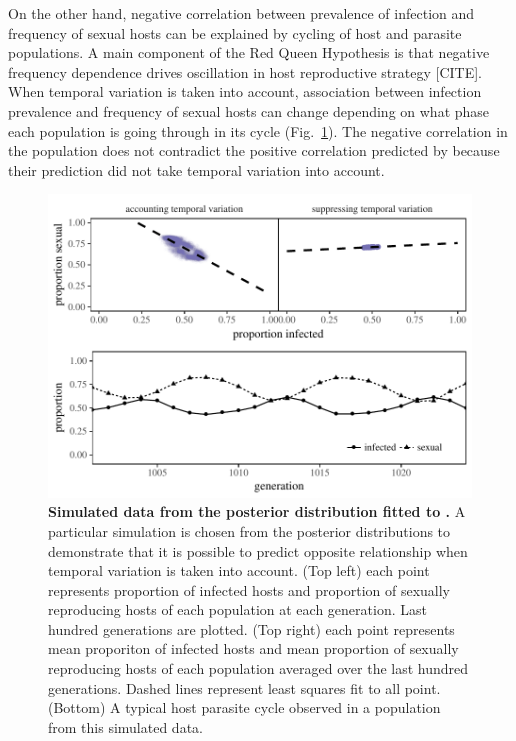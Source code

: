 \documentclass{article}\usepackage[]{graphicx}\usepackage[]{color}
\newcommand{\fref}[1]{Fig.~\ref{fig:#1}}
\begin{document}
On the other hand, negative correlation between prevalence of infection and frequency of sexual hosts can be explained by cycling of host and parasite populations.
A main component of the Red Queen Hypothesis is that negative frequency dependence drives oscillation in host reproductive strategy [CITE].
When temporal variation is taken into account, association between infection prevalence and frequency of sexual hosts can change depending on what phase each population is going through in its cycle (\fref{cycle}).
The negative correlation in the population does not contradict the positive correlation predicted by \cite{lively2001trematode} because their prediction did not take temporal variation into account.

\begin{figure}[!htp]
\includegraphics[width=\textwidth]{../fig/cycle_example.pdf}
\caption{{\bf Simulated data from the posterior distribution fitted to \cite{vergara2014infection}.}
A particular simulation is chosen from the posterior distributions to demonstrate that it is possible to predict opposite relationship when temporal variation is taken into account. (Top left) each point represents proportion of infected hosts and proportion of sexually reproducing hosts of each population at each generation. Last hundred generations are plotted. (Top right) each point represents mean proporiton of infected hosts and mean proportion of sexually reproducing hosts of each population averaged over the last hundred generations. Dashed lines represent least squares fit to all point. (Bottom) A typical host parasite cycle observed in a population from this simulated data. %
}
\label{fig:cycle}
\end{figure}
\end{document}
